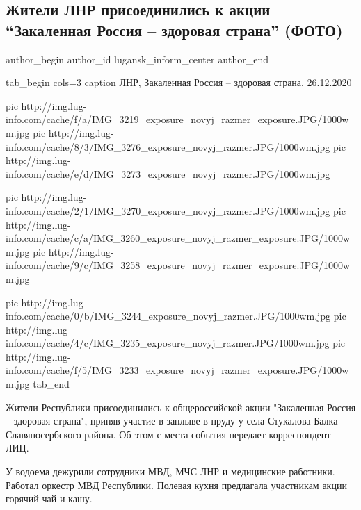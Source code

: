  
 
 
 
 
 
\subsection{Жители ЛНР присоединились к акции \enquote{Закаленная Россия – здоровая страна} (ФОТО)}
\label{sec:26_12_2020.news.lnr.lug_info.lugansk_inform_center.1.zakalennaja_rossia}
\ifcmt
	author_begin
   author_id lugansk_inform_center
	author_end
\fi


\ifcmt
tab_begin cols=3
	caption ЛНР, Закаленная Россия – здоровая страна, 26.12.2020

  pic http://img.lug-info.com/cache/f/a/IMG_3219_exposure_novyj_razmer_exposure.JPG/1000wm.jpg
	pic http://img.lug-info.com/cache/8/3/IMG_3276_exposure_novyj_razmer.JPG/1000wm.jpg
	pic http://img.lug-info.com/cache/e/d/IMG_3273_exposure_novyj_razmer.JPG/1000wm.jpg

	pic http://img.lug-info.com/cache/2/1/IMG_3270_exposure_novyj_razmer.JPG/1000wm.jpg
	pic http://img.lug-info.com/cache/c/a/IMG_3260_exposure_novyj_razmer_exposure.JPG/1000wm.jpg
	pic http://img.lug-info.com/cache/9/c/IMG_3258_exposure_novyj_razmer_exposure.JPG/1000wm.jpg

	pic http://img.lug-info.com/cache/0/b/IMG_3244_exposure_novyj_razmer.JPG/1000wm.jpg
	pic http://img.lug-info.com/cache/4/c/IMG_3235_exposure_novyj_razmer.JPG/1000wm.jpg
	pic http://img.lug-info.com/cache/f/5/IMG_3233_exposure_novyj_razmer_exposure.JPG/1000wm.jpg
tab_end
\fi

Жители Республики присоединились к общероссийской акции "Закаленная Россия –
здоровая страна", приняв участие в заплыве в пруду у села Стукалова Балка
Славяносербского района. Об этом с места события передает корреспондент ЛИЦ.

У водоема дежурили сотрудники МВД, МЧС ЛНР и медицинские работники. Работал
оркестр МВД Республики. Полевая кухня предлагала участникам акции горячий чай и
кашу.

